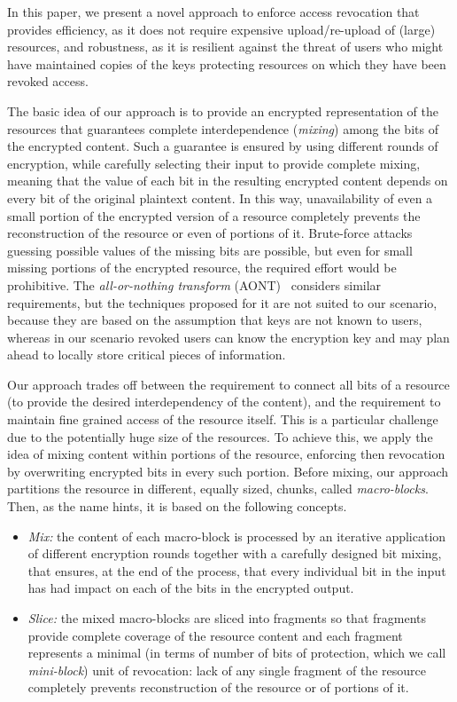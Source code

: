 \medskip
{}
In this paper, we present a novel approach to enforce access revocation that provides efficiency, as it does not require expensive upload/re-upload of (large) resources, and robustness, as it is resilient against the threat of users who might have maintained copies of the keys protecting resources on which they have been revoked access.

The basic idea of our approach is to provide an encrypted representation of the resources that guarantees complete interdependence ({\em mixing\/}) among the bits of the encrypted content. Such a guarantee is ensured by using different rounds of encryption, while carefully selecting their input to provide complete mixing, meaning that the value of each bit in the resulting encrypted content depends on every bit of the original plaintext content. In this way, unavailability of even a small portion of the encrypted version of a resource completely prevents the reconstruction of the resource or even of portions of it. Brute-force attacks guessing possible values of the missing bits are possible, but even for small missing portions of the encrypted resource, the required effort would be prohibitive.
The {\em all-or-nothing transform} (AONT)~\cite{r97} considers similar requirements, but the techniques proposed for it are not suited to our scenario, because they are based on the assumption that keys are not known to users, whereas in our scenario revoked users can know the encryption key and may plan ahead to locally store critical pieces of information.

Our approach trades off between the requirement to connect all bits of a resource (to provide the desired interdependency of the content), and the requirement to maintain fine grained access of the resource itself. This is a particular challenge due to the potentially huge size of the resources. To achieve this, we apply the idea of mixing content within portions of the resource, enforcing then revocation by overwriting encrypted bits in every such portion. Before mixing, our approach partitions the resource in different, equally sized, chunks, called {\em macro-blocks\/}. Then, as the name hints, it is based on the following concepts.

\begin{itemize}

\item {\em Mix:\/} the content of each macro-block is processed by  an iterative application of different encryption rounds together with  a carefully designed bit mixing, that ensures, at the end of the process, that every individual bit in the input has had impact on each of the bits in the encrypted output.

\item {\em Slice:\/} the mixed macro-blocks are sliced into fragments so that  fragments provide complete coverage of the resource content and each fragment represents a minimal (in terms of number of bits of protection, which we call {\em mini-block\/}) unit of revocation: lack of any single fragment of the resource completely prevents reconstruction of the resource or of portions of it.
\end{itemize}

